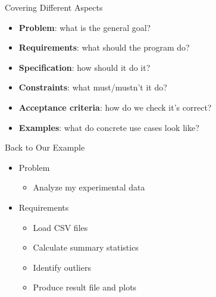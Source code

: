 \documentclass[
ps,
]{prosper}
\begin{document}
\begin{slide}{Covering Different Aspects}

\begin{itemize}

\item \textbf{Problem}: what is the general goal?

\item \textbf{Requirements}: what should the program do?

\item \textbf{Specification}: how should it do it?

\item \textbf{Constraints}: what must/mustn't it do?

\item \textbf{Acceptance criteria}: how do we check it's correct?

\item \textbf{Examples}: what do concrete use cases look like?

\end{itemize}
  
\end{slide}



\begin{slide}{Back to Our Example}

\begin{itemize}

\item Problem
  
\begin{itemize}

\item Analyze my experimental data

\end{itemize}

\item Requirements
  
\begin{itemize}

\item Load CSV files
\item Calculate summary statistics
\item Identify outliers
\item Produce result file and plots

\end{itemize}
  
\end{itemize}
  
\end{slide}
\end{document}
